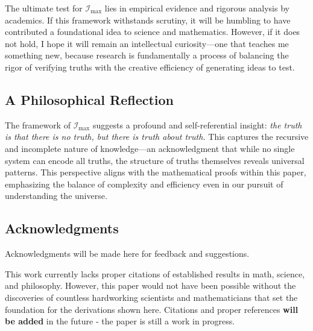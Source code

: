 \documentclass[12pt]{article}
\begin{document}
The ultimate test for \(\mathcal{I}_{\text{max}}\) lies in empirical evidence and rigorous analysis by academics. If this framework withstands scrutiny, it will be humbling to have contributed a foundational idea to science and mathematics. However, if it does not hold, I hope it will remain an intellectual curiosity—one that teaches me something new, because research is fundamentally a process of balancing the rigor of verifying truths with the creative efficiency of generating ideas to test.

\subsection*{A Philosophical Reflection}

The framework of \(\mathcal{I}_{\text{max}}\) suggests a profound and self-referential insight: \textit{the truth is that there is no truth, but there is truth about truth.} This captures the recursive and incomplete nature of knowledge—an acknowledgment that while no single system can encode all truths, the structure of truths themselves reveals universal patterns. This perspective aligns with the mathematical proofs within this paper, emphasizing the balance of complexity and efficiency even in our pursuit of understanding the universe.


\subsection{Acknowledgments}
Acknowledgments will be made here for feedback and suggestions.

This work currently lacks proper citations of established results in math, science, and philosophy. However, this paper would not have been possible without the discoveries of countless hardworking scientists and mathematicians that set the foundation for the derivations shown here. Citations and proper references \textbf{will be added} in the future - the paper is still a work in progress.
\end{document}
